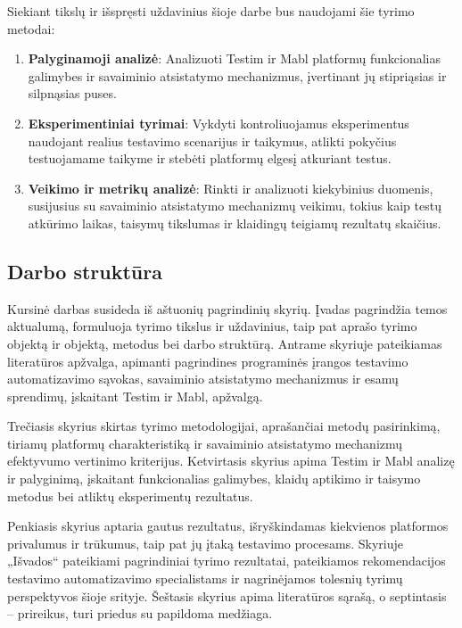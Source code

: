 \documentclass[
]{VUMIFPSkursinis}
\begin{document}
Siekiant tikslų ir išspręsti uždavinius šioje darbe bus naudojami šie tyrimo metodai:

\begin{enumerate}
    \item \textbf{Palyginamoji analizė}: Analizuoti Testim ir Mabl platformų funkcionalias galimybes ir savaiminio atsistatymo mechanizmus, įvertinant jų stipriąsias ir silpnąsias puses.
    \item \textbf{Eksperimentiniai tyrimai}: Vykdyti kontroliuojamus eksperimentus naudojant realius testavimo scenarijus ir taikymus, atlikti pokyčius testuojamame taikyme ir stebėti platformų elgesį atkuriant testus.
    \item \textbf{Veikimo ir metrikų analizė}: Rinkti ir analizuoti kiekybinius duomenis, susijusius su savaiminio atsistatymo mechanizmų veikimu, tokius kaip testų atkūrimo laikas, taisymų tikslumas ir klaidingų teigiamų rezultatų skaičius.
\end{enumerate}

\subsection{Darbo struktūra}

Kursinė darbas susideda iš aštuonių pagrindinių skyrių. Įvadas pagrindžia temos aktualumą, formuluoja tyrimo tikslus ir uždavinius, taip pat aprašo tyrimo objektą ir objektą, metodus bei darbo struktūrą. Antrame skyriuje pateikiamas literatūros apžvalga, apimanti pagrindines programinės įrangos testavimo automatizavimo sąvokas, savaiminio atsistatymo mechanizmus ir esamų sprendimų, įskaitant Testim ir Mabl, apžvalgą.

Trečiasis skyrius skirtas tyrimo metodologijai, aprašančiai metodų pasirinkimą, tiriamų platformų charakteristiką ir savaiminio atsistatymo mechanizmų efektyvumo vertinimo kriterijus. Ketvirtasis skyrius apima Testim ir Mabl analizę ir palyginimą, įskaitant funkcionalias galimybes, klaidų aptikimo ir taisymo metodus bei atliktų eksperimentų rezultatus.

Penkiasis skyrius aptaria gautus rezultatus, išryškindamas kiekvienos platformos privalumus ir trūkumus, taip pat jų įtaką testavimo procesams. Skyriuje „Išvados“ pateikiami pagrindiniai tyrimo rezultatai, pateikiamos rekomendacijos testavimo automatizavimo specialistams ir nagrinėjamos tolesnių tyrimų perspektyvos šioje srityje. Šeštasis skyrius apima literatūros sąrašą, o septintasis – prireikus, turi priedus su papildoma medžiaga.
\end{document}
